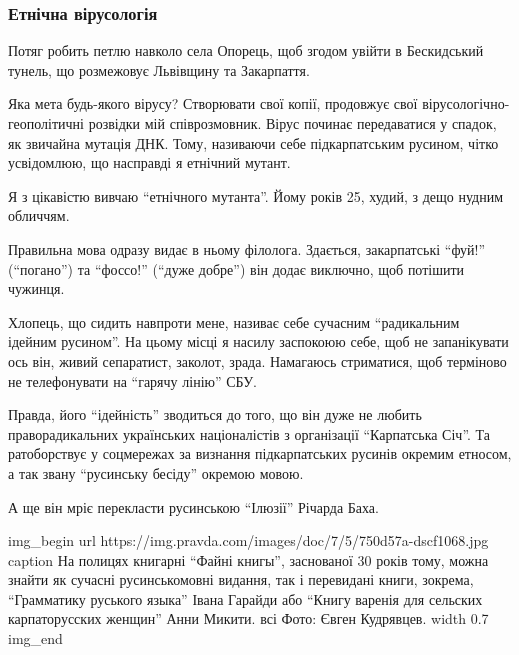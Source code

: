  
 
 

\subsubsection{Етнічна вірусологія}

Потяг робить петлю навколо села Опорець, щоб згодом увійти в Бескидський
тунель, що розмежовує Львівщину та Закарпаття.

\dshM Яка мета будь-якого вірусу? Створювати свої копії, \dshM продовжує свої
вірусологічно-геополітичні розвідки мій співрозмовник. \dshM Вірус починає
передаватися у спадок, як звичайна мутація ДНК. Тому, називаючи себе
підкарпатським русином, чітко усвідомлюю, що насправді я етнічний мутант.

Я з цікавістю вивчаю \enquote{етнічного мутанта}. Йому років 25, худий, з дещо нудним
обличчям.

Правильна мова одразу видає в ньому філолога. Здається, закарпатські \enquote{фуй!}
(\enquote{погано}) та \enquote{фоссо!} (\enquote{дуже добре}) він додає виключно, щоб потішити чужинця.

Хлопець, що сидить навпроти мене, називає себе сучасним \enquote{радикальним ідейним
русином}. На цьому місці я насилу заспокоюю себе, щоб не запанікувати \dshM ось
він, живий сепаратист, заколот, зрада. Намагаюсь стриматися, щоб терміново не
телефонувати на \enquote{гарячу лінію} СБУ. 

Правда, його \enquote{ідейність} зводиться до того, що він дуже не любить
праворадикальних українських націоналістів з організації \enquote{Карпатська Січ}. Та
ратоборствує у соцмережах за визнання підкарпатських русинів окремим етносом, а
так звану \enquote{русинську бесіду} \dshM окремою мовою.

А ще він мріє перекласти русинською \enquote{Ілюзії} Річарда Баха.

\ifcmt
img_begin 
    url https://img.pravda.com/images/doc/7/5/750d57a-dscf1068.jpg
    caption На полицях книгарні \enquote{Файні книгы}, заснованої 30 років тому, можна знайти як сучасні русинськомовні видання, так і перевидані книги, зокрема, \enquote{Грамматику руського языка} Івана Гарайди або \enquote{Книгу варенія для сельских карпаторусских женщин} Анни Микити. всі Фото: Євген Кудрявцев.
    width 0.7
img_end
\fi


